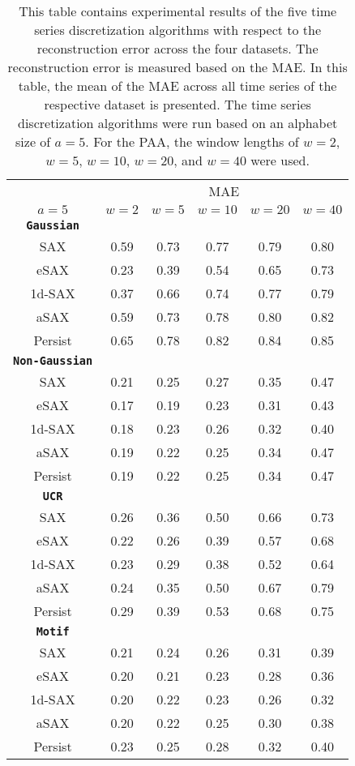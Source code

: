 \begin{table}[htb]
\centering
\begin{tabular}{cccccc} 
\toprule
& \multicolumn{5}{c}{\ac{MAE}} \\
\cmidrule(lr){2-6}
$a = 5$ & $w = 2$ & $w = 5$ & $w = 10$ & $w = 20$ & $w = 40$ \\
\midrule
\textbf{\texttt{Gaussian}} &  &  &  &  & \\
\ac{SAX} & 0.59 & 0.73 & 0.77 & 0.79 & 0.80 \\
\ac{eSAX} & 0.23 & 0.39 & 0.54 & 0.65 & 0.73 \\
\ac{1d-SAX} & 0.37 & 0.66 & 0.74 & 0.77 & 0.79 \\
\ac{aSAX} & 0.59 & 0.73 & 0.78 & 0.80 & 0.82 \\
Persist & 0.65 & 0.78 & 0.82 & 0.84 & 0.85 \\
\midrule
\textbf{\texttt{Non-Gaussian}} &  &  &  &  & \\
\ac{SAX} & 0.21 & 0.25 & 0.27 & 0.35 & 0.47 \\
\ac{eSAX} & 0.17 & 0.19 & 0.23 & 0.31 & 0.43 \\
\ac{1d-SAX} & 0.18 & 0.23 & 0.26 & 0.32 & 0.40 \\
\ac{aSAX} & 0.19 & 0.22 & 0.25 & 0.34 & 0.47 \\
Persist & 0.19 & 0.22 & 0.25 & 0.34 & 0.47 \\
\midrule
\textbf{\texttt{UCR}} &  &  &  &  & \\
\ac{SAX} & 0.26 & 0.36 & 0.50 & 0.66 & 0.73 \\
\ac{eSAX} & 0.22 & 0.26 & 0.39 & 0.57 & 0.68 \\
\ac{1d-SAX} & 0.23 & 0.29 & 0.38 & 0.52 & 0.64 \\
\ac{aSAX} & 0.24 & 0.35 & 0.50 & 0.67 & 0.79 \\
Persist & 0.29 & 0.39 & 0.53 & 0.68 & 0.75 \\
\midrule
\textbf{\texttt{Motif}} &  &  &  &  & \\
\ac{SAX} & 0.21 & 0.24 & 0.26 & 0.31 & 0.39 \\
\ac{eSAX} & 0.20 & 0.21 & 0.23 & 0.28 & 0.36 \\
\ac{1d-SAX} & 0.20 & 0.22 & 0.23 & 0.26 & 0.32 \\
\ac{aSAX} & 0.20 & 0.22 & 0.25 & 0.30 & 0.38 \\
Persist & 0.23 & 0.25 & 0.28 & 0.32 & 0.40 \\
\bottomrule
\end{tabular}
\vspace*{0.5cm}
\caption[Reconstruction Error - Evaluation: Window Length]{This table contains experimental results of the five time series discretization algorithms with respect to the reconstruction error across the four datasets. The reconstruction error is measured based on the \ac{MAE}. In this table, the mean of the \ac{MAE} across all time series of the respective dataset is presented. The time series discretization algorithms were run based on an alphabet size of $a = 5$. For the \ac{PAA}, the window lengths of $w = 2$, $w = 5$, $w = 10$, $w = 20$, and $w = 40$ were used.}
\label{tab:recon_error_window_length}
\end{table}
